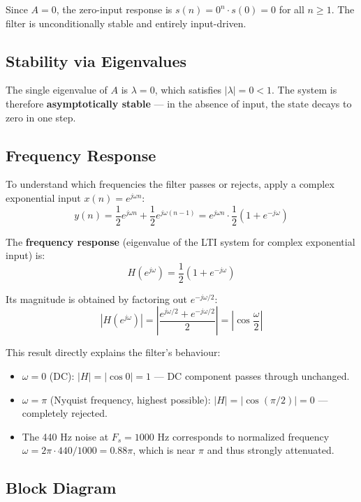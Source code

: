 \documentclass[11pt]{article}
\begin{document}
Since $A = 0$, the zero-input response is $s(n) = 0^n \cdot s(0) = 0$ for all $n \geq 1$. The filter is unconditionally stable and entirely input-driven.

\subsection{Stability via Eigenvalues}

The single eigenvalue of $A$ is $\lambda = 0$, which satisfies $|\lambda| = 0 < 1$. The system is therefore \textbf{asymptotically stable} — in the absence of input, the state decays to zero in one step.

\subsection{Frequency Response}

To understand which frequencies the filter passes or rejects, apply a complex exponential input $x(n) = e^{j\omega n}$:
\[
  y(n) = \frac{1}{2}e^{j\omega n} + \frac{1}{2}e^{j\omega(n-1)} = e^{j\omega n} \cdot \frac{1}{2}\left(1 + e^{-j\omega}\right)
\]

The \textbf{frequency response} (eigenvalue of the LTI system for complex exponential input) is:
\[
  H(e^{j\omega}) = \frac{1}{2}\left(1 + e^{-j\omega}\right)
\]

Its magnitude is obtained by factoring out $e^{-j\omega/2}$:
\[
  \left|H(e^{j\omega})\right| = \left|\frac{e^{j\omega/2} + e^{-j\omega/2}}{2}\right| = \left|\cos\frac{\omega}{2}\right|
\]

This result directly explains the filter's behaviour:
\begin{itemize}
  \item $\omega = 0$ (DC): $|H| = |\cos 0| = 1$ — DC component passes through unchanged.
  \item $\omega = \pi$ (Nyquist frequency, highest possible): $|H| = |\cos(\pi/2)| = 0$ — completely rejected.
  \item The 440 Hz noise at $F_s = 1000$ Hz corresponds to normalized frequency $\omega = 2\pi \cdot 440/1000 = 0.88\pi$, which is near $\pi$ and thus strongly attenuated.
\end{itemize}

\subsection{Block Diagram}
\end{document}
